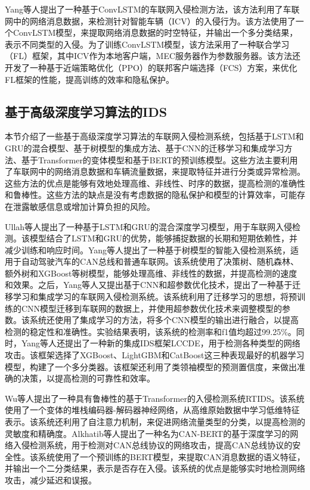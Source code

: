 Yang等人\cite{Federated-AI-Enabled-IDS}提出了一种基于ConvLSTM的车联网入侵检测方法，该方法利用了车联网中的网络消息数据，来检测针对智能车辆（ICV）的入侵行为。该方法使用了一个ConvLSTM模型，来提取网络消息数据的时空特征，并输出一个多分类结果，表示不同类型的入侵。为了训练ConvLSTM模型，该方法采用了一种联合学习（FL）框架，其中ICV作为本地客户端，MEC服务器作为参数服务器。该方法还开发了一种基于近端策略优化（PPO）的联邦客户端选择（FCS）方案，来优化FL框架的性能，提高训练的效率和隐私保护。

\subsection{基于高级深度学习算法的IDS}

本节介绍了一些基于高级深度学习算法的车联网入侵检测系统，包括基于LSTM和GRU的混合模型、基于树模型的集成方法、基于CNN的迁移学习和集成学习方法、基于Transformer的变体模型和基于BERT的预训练模型。这些方法主要利用了车联网中的网络消息数据和车辆流量数据，来提取特征并进行分类或异常检测。这些方法的优点是能够有效地处理高维、非线性、时序的数据，提高检测的准确性和鲁棒性。这些方法的缺点是没有考虑数据的隐私保护和模型的计算效率，可能存在泄露敏感信息或增加计算负担的风险。

Ullah等人\cite{ref15}提出了一种基于LSTM和GRU的混合深度学习模型，用于车联网入侵检测。该模型结合了LSTM和GRU的优势，能够捕捉数据的长期和短期依赖性，并减少训练和响应时间。Yang等人\cite{ref16}提出了一种基于树模型的智能入侵检测系统，适用于自动驾驶汽车的CAN总线和普通车联网。该系统使用了决策树、随机森林、额外树和XGBoost等树模型，能够处理高维、非线性的数据，并提高检测的速度和效果。之后，Yang等人\cite{A_Transfer_Learning_and_Optimized_CNN_Based_Intrusion_Detection_System_for_Internet_of_Vehicles}又提出基于CNN和超参数优化技术，提出了一种基于迁移学习和集成学习的车联网入侵检测系统。该系统利用了迁移学习的思想，将预训练的CNN模型迁移到车联网的数据上，并使用超参数优化技术来调整模型的参数。该系统还使用了集成学习的方法，将多个CNN模型的输出进行融合，以提高检测的稳定性和准确性。实验结果表明，该系统的检测率和f1值均超过99.25\%。同时，Yang等人\cite{ref18}还提出了一种新的集成IDS框架LCCDE，用于检测各种类型的网络攻击。该框架选择了XGBoost、LightGBM和CatBoost这三种表现最好的机器学习模型，构建了一个多分类器。该框架还利用了类领袖模型的预测置信度，来做出准确的决策，以提高检测的可靠性和效率。

Wu等人\cite{RTIDS}提出了一种具有鲁棒性的基于Transformer的入侵检测系统RTIDS。该系统使用了一个变体的堆栈编码器-解码器神经网络，从高维原始数据中学习低维特征表示。该系统还利用了自注意力机制，来促进网络流量类型的分类，以提高检测的灵敏度和精确度。Alkhatib等人\cite{can_ids}提出了一种名为CAN-BERT的基于深度学习的网络入侵检测系统，用于检测对CAN总线协议的网络攻击，提高CAN总线协议的安全性。该系统使用了一个预训练的BERT模型，来提取CAN消息数据的语义特征，并输出一个二分类结果，表示是否存在入侵。该系统的优点是能够实时地检测网络攻击，减少延迟和误报。

